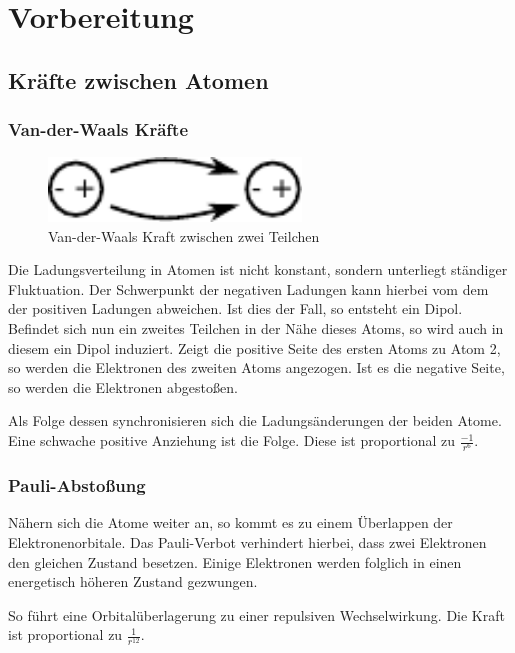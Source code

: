 \chapter{Vorbereitung}

    \section{Kräfte zwischen Atomen}
        \subsection{Van-der-Waals Kräfte}

\begin{figure}[htb]
    \centering
    \includegraphics[width=0.6\textwidth]{Abb/vdw.pdf}
    \caption{Van-der-Waals Kraft zwischen zwei Teilchen}
    \label{vdw}
\end{figure}

Die Ladungsverteilung in Atomen ist nicht konstant, sondern unterliegt ständiger 
Fluktuation. Der Schwerpunkt der negativen Ladungen kann hierbei vom dem der
positiven Ladungen abweichen. Ist dies der Fall, so entsteht ein Dipol. 
Befindet sich nun ein zweites Teilchen in der Nähe dieses Atoms, so wird auch
in diesem ein Dipol induziert. Zeigt die positive Seite des ersten Atoms zu Atom 2,
so werden die Elektronen des zweiten Atoms angezogen. Ist es die negative Seite, so
werden die Elektronen abgestoßen. \par
Als Folge dessen synchronisieren sich die Ladungsänderungen der beiden Atome. Eine
schwache positive Anziehung ist die Folge. Diese ist proportional zu $\displaystyle
\frac{-1}{r^6}$.

        \subsection{Pauli-Abstoßung}

Nähern sich die Atome weiter an, so kommt es zu einem Überlappen der 
Elektronenorbitale. Das Pauli-Verbot verhindert hierbei, dass zwei Elektronen den
gleichen Zustand besetzen. Einige Elektronen werden folglich in einen energetisch
höheren Zustand gezwungen. \par
So führt eine Orbitalüberlagerung zu einer repulsiven Wechselwirkung. Die Kraft
ist proportional zu $\displaystyle \frac{1}{r^{12}}$.

